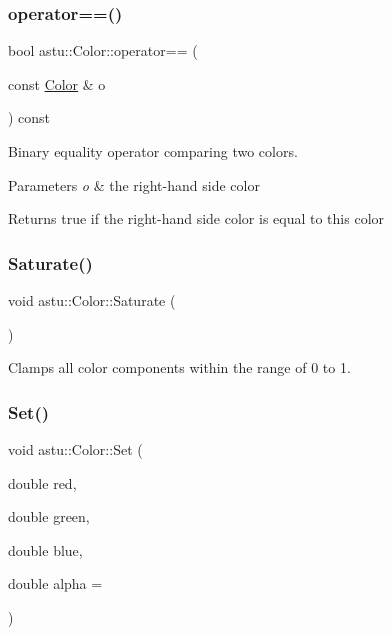 \subsubsection{\texorpdfstring{operator==()}{operator==()}}
{\footnotesize\ttfamily bool astu\+::\+Color\+::operator== (\begin{DoxyParamCaption}\item[{const \hyperlink{classastu_1_1Color}{Color} \&}]{o }\end{DoxyParamCaption}) const}

Binary equality operator comparing two colors.


\begin{DoxyParams}{Parameters}
{\em o} & the right-\/hand side color \\
\hline
\end{DoxyParams}
\begin{DoxyReturn}{Returns}
{\ttfamily true} if the right-\/hand side color is equal to this color 
\end{DoxyReturn}
\mbox{\label{classastu_1_1Color_a612db0af9e13a8c64f1c215964d4d88f}} 
\subsubsection{\texorpdfstring{Saturate()}{Saturate()}}
{\footnotesize\ttfamily void astu\+::\+Color\+::\+Saturate (\begin{DoxyParamCaption}{ }\end{DoxyParamCaption})}

Clamps all color components within the range of 0 to 1. \mbox{\label{classastu_1_1Color_a709d6f647c38187f1d4028810dfa363e}} 
\subsubsection{\texorpdfstring{Set()}{Set()}}
{\footnotesize\ttfamily void astu\+::\+Color\+::\+Set (\begin{DoxyParamCaption}\item[{double}]{red,  }\item[{double}]{green,  }\item[{double}]{blue,  }\item[{double}]{alpha = {} }\end{DoxyParamCaption})}

